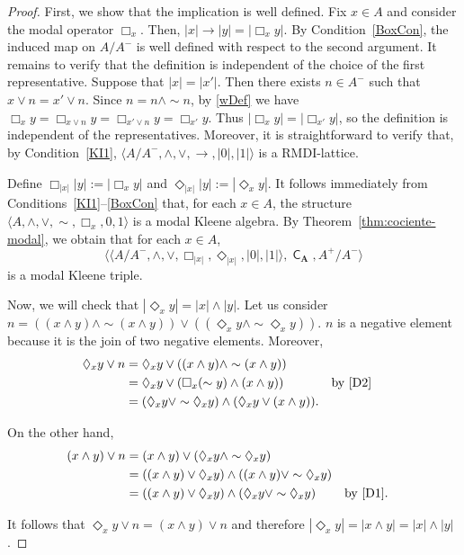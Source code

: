 \documentclass[10pt,a4paper]{amsart}
\DeclareMathOperator{\con}{\mathsf{C}}
\begin{document}
\begin{proof}
First, we show that the implication is well defined. Fix $x\in A$ and consider the modal operator $\Box_x$. Then, $|x| \to |y|=|\Box_x y|$. By Condition~\eqref{BoxCon}, the induced map on $A/A^{-}$ is well defined with respect to the second argument. It remains to verify that the definition is independent of the choice of the first representative. Suppose that $|x|=|x'|$. Then there exists $n\in A^{-}$ such that $x \vee n = x' \vee n$. Since $n = n \wedge \sim n$, by \eqref{wDef} we have $\Box_x y = \Box_{x \vee n}y=\Box_{x' \vee n}y=\Box_{x'}y$. Thus $|\Box_x y| = |\Box_{x'} y|$, so the definition is independent of the representatives. Moreover, it is straightforward to verify that, by Condition~\eqref{KI1}, $\langle A/A^{-},\wedge,\vee,\to,|0|,|1|\rangle$ is a RMDI-lattice.

Define $\Box_{|x|}|y|:=|\Box_xy|$ and $\Diamond_{|x|}|y|:=|\Diamond_xy|$. It follows immediately from Conditions~\eqref{KI1}--\eqref{BoxCon} that, for each $x\in A$, the structure $\langle A,\wedge,\vee,\sim,\Box_x,0,1\rangle$ is a modal Kleene algebra. By Theorem~\ref{thm:cociente-modal}, we obtain that for each $x\in A$, $$\langle \langle A/A^{-},\wedge,\vee,\Box_{|x|},\Diamond_{|x|},|0|,|1|\rangle, \con_{\mathbf{A}},A^+/A^{-}\rangle$$ is a modal Kleene triple.

Now, we will check that $|\Diamond_xy|=|x|\wedge|y|$. Let us consider $n=((x\wedge y)\wedge \sim (x\wedge y))\vee ((\Diamond_xy\wedge\sim \Diamond_xy))$. $n$ is a negative element because it is the join of two negative elements. Moreover,
\[
\begin{aligned}
\Diamond_xy\vee n
&=\Diamond_xy
  \vee((x\wedge y)\wedge\sim(x\wedge y))\\
&=\Diamond_xy
  \vee(\Box_x(\sim y)\wedge(x\wedge y))
  &&\text{by \eqref{D2}}\\
&=(\Diamond_xy\vee\sim\Diamond_xy)
  \wedge(\Diamond_xy\vee(x\wedge y)).
\end{aligned}
\]

On the other hand,
\[
\begin{aligned}
(x\wedge y)\vee n
&=(x\wedge y)\vee(\Diamond_xy\wedge\sim\Diamond_xy)\\
&=((x\wedge y)\vee\Diamond_xy)
  \wedge((x\wedge y)\vee\sim\Diamond_xy)\\
&=((x\wedge y)\vee\Diamond_xy)
  \wedge(\Diamond_xy\vee\sim\Diamond_xy) &&\text{by \eqref{D1}.}\\
\end{aligned}
\]

It follows that $ \Diamond_xy\vee n=(x\wedge y)\vee n$ and therefore $|\Diamond_x y|=|x\wedge y|=|x|\wedge|y|$.

\end{proof}
\end{document}

